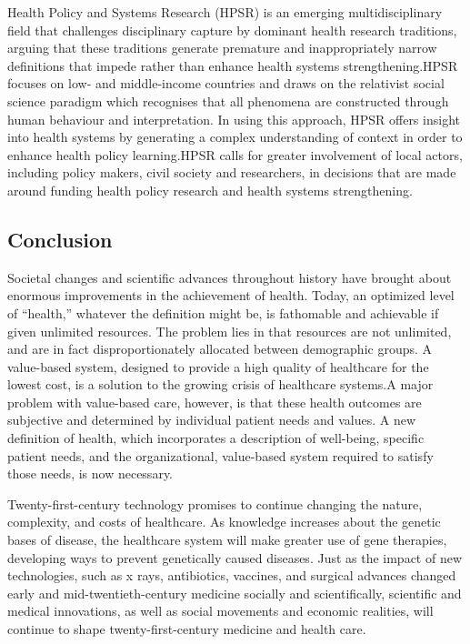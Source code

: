 \documentclass[12pt]{article}
\begin{document}
Health Policy and Systems Research (HPSR) is an emerging multidisciplinary field that challenges disciplinary capture by dominant health research traditions, arguing that these traditions generate premature and inappropriately narrow definitions that impede rather than enhance health systems strengthening.HPSR focuses on low- and middle-income countries and draws on the relativist social science paradigm which recognises that all phenomena are constructed through human behaviour and interpretation. In using this approach, HPSR offers insight into health systems by generating a complex understanding of context in order to enhance health policy learning.HPSR calls for greater involvement of local actors, including policy makers, civil society and researchers, in decisions that are made around funding health policy research and health systems strengthening.

\subsection{Conclusion}
Societal changes and scientific advances throughout history have brought about enormous improvements in the achievement of health. Today, an optimized level of “health,” whatever the definition might be, is fathomable and achievable if given unlimited resources. The problem lies in that resources are not unlimited, and are in fact disproportionately allocated between demographic groups. A value-based system, designed to provide a high quality of healthcare for the lowest cost, is a solution to the growing crisis of healthcare systems.A major problem with value-based care, however, is that these health outcomes are subjective and determined by individual patient needs and values. A new definition of health, which  incorporates a description of well-being, specific patient needs, and the organizational, value-based system required to satisfy those needs, is now necessary.

Twenty-first-century technology promises to continue changing the nature, complexity, and costs of healthcare. As knowledge increases about the genetic bases of disease, the healthcare system will make greater use of gene therapies, developing ways to prevent genetically caused diseases. Just as the impact of new technologies, such as x rays, antibiotics, vaccines, and surgical advances changed early and mid-twentieth-century medicine socially and scientifically, scientific and medical innovations, as well as social movements and economic realities, will continue to shape twenty-first-century medicine and health care.    
 
\end{document}
